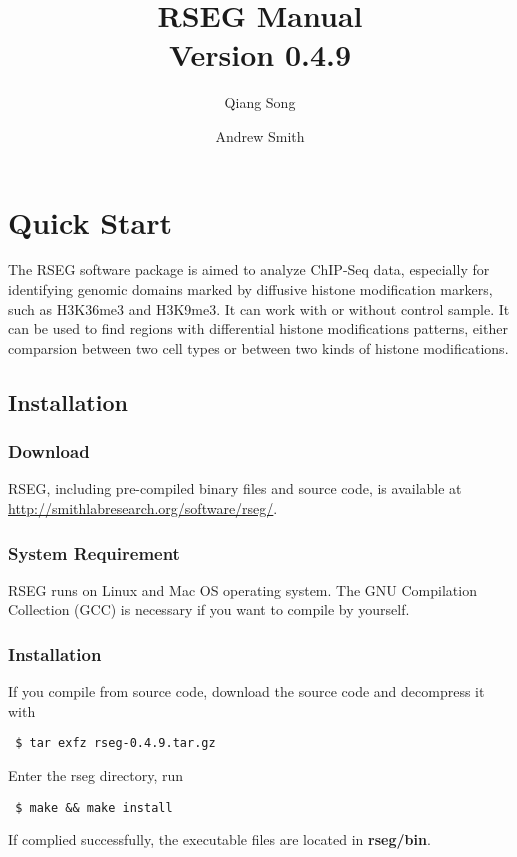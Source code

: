 \documentclass[11pt]{report}
\title{RSEG Manual \\
Version 0.4.9}
\author{Qiang Song \and Andrew Smith}
\begin{document}
\maketitle

\chapter{Quick Start}
\label{chap:quick-start}

The RSEG software package is aimed to analyze ChIP-Seq data,
especially for identifying genomic domains marked by diffusive histone
modification markers, such as H3K36me3 and H3K9me3. It can work with
or without control sample. It can be used to find regions with
differential histone modifications patterns, either comparsion between
two cell types or between two kinds of histone modifications.

\section{Installation}
\label{sec:install}

\subsection*{Download}

RSEG, including pre-compiled binary files and source code, is
available at \url{http://smithlabresearch.org/software/rseg/}.

\subsection*{System Requirement}

RSEG runs on Linux and Mac OS operating system. The GNU Compilation
Collection (GCC) is necessary if you want to compile by yourself.

\subsection*{Installation}

If you compile from source code, download the source code and
decompress it with
\begin{verbatim}
 $ tar exfz rseg-0.4.9.tar.gz
\end{verbatim}
%
Enter the rseg directory, run
\begin{verbatim}
 $ make && make install
\end{verbatim}
%
If complied successfully, the executable files are located in \textbf{rseg/bin}.
\end{document}
